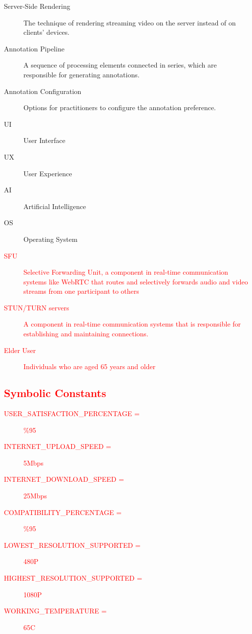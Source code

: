 \documentclass[12pt]{article}
\begin{document}
\begin{description}
    \item[Server-Side Rendering]  The technique of rendering streaming video on the server instead of on clients' devices.
    \item[Annotation Pipeline] A sequence of processing elements connected in series, which are responsible for generating annotations.
    \item[Annotation Configuration] Options for practitioners to configure the annotation preference.
    \item[UI] User Interface
    \item[UX] User Experience
    \item[AI] Artificial Intelligence
    \item[OS] Operating System
    \item[\textcolor{red}{SFU}] \textcolor{red}{Selective Forwarding Unit, a component in real-time communication systems like WebRTC
    that routes and selectively forwards audio and video streams from one participant to others}
    \item[\textcolor{red}{STUN/TURN servers}] \textcolor{red}{A component in real-time communication systems that is responsible for
    establishing and maintaining connections.}
    \item[\textcolor{red}{Elder User}] \textcolor{red}{Individuals who are aged 65 years and older}
\end{description}

\subsection{\textcolor{red}{Symbolic Constants}}\label{sec:symbolic-constants}
\begin{description}
    \item[\textcolor{red}{USER\_SATISFACTION\_PERCENTAGE =}] \textcolor{red}{\%95}
    \item[\textcolor{red}{INTERNET\_UPLOAD\_SPEED =}] \textcolor{red}{5Mbps} 
    \item[\textcolor{red}{INTERNET\_DOWNLOAD\_SPEED =}] \textcolor{red}{25Mbps} 
    \item[\textcolor{red}{COMPATIBILITY\_PERCENTAGE =}] \textcolor{red}{\%95}
    \item[\textcolor{red}{LOWEST\_RESOLUTION\_SUPPORTED =}] \textcolor{red}{480P}
    \item[\textcolor{red}{HIGHEST\_RESOLUTION\_SUPPORTED =}] \textcolor{red}{1080P}
    \item[\textcolor{red}{WORKING\_TEMPERATURE =}] \textcolor{red}{65\degree C}
\end{description}
\end{document}

